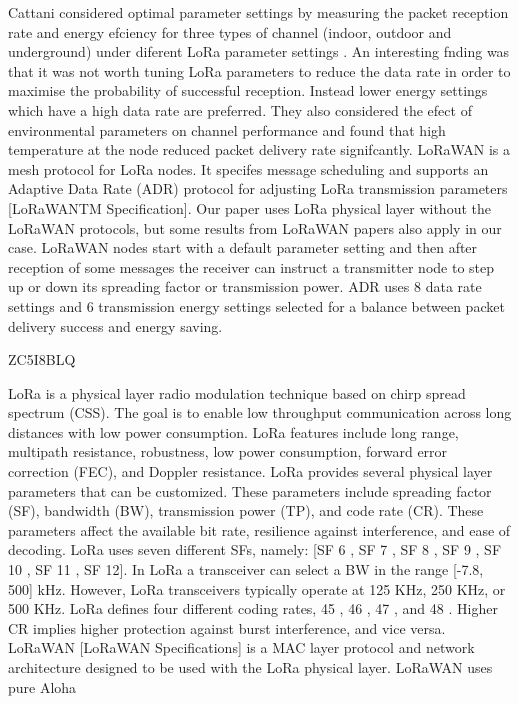 Cattani considered optimal parameter settings by measuring the packet reception rate and energy efciency for three types of channel (indoor,
	outdoor and underground) under diferent LoRa parameter settings \cite{marco_cattani_experimental_2017}.
An interesting fnding was that it was not worth tuning LoRa parameters to reduce the data rate in order to maximise the probability of successful reception.
Instead lower energy settings which have a high data rate are preferred.
They also considered the efect of environmental parameters on channel performance and found that high temperature at the node reduced packet delivery rate signifcantly.
LoRaWAN is a mesh protocol for LoRa nodes.
It specifes message scheduling and supports an Adaptive Data Rate (ADR) protocol for adjusting LoRa transmission parameters [LoRaWANTM Specification].
Our paper uses LoRa physical layer without the LoRaWAN protocols,
	but some results from LoRaWAN papers also apply in our case.
LoRaWAN nodes start with a default parameter setting and then after reception of some messages the receiver can instruct a transmitter node to step up or down its spreading factor or transmission power.
ADR uses 8 data rate settings and 6 transmission energy settings selected for a balance between packet delivery success and energy saving.


\cite{farooq_search_2018} ZC5I8BLQ

LoRa is a physical layer radio modulation technique based on chirp spread spectrum (CSS).
The goal is to enable low throughput communication across long distances with low power consumption.
LoRa features include long range,
	multipath resistance,
	robustness,
	low power consumption,
	forward error correction (FEC),
	and Doppler resistance.
LoRa provides several physical layer parameters that can be customized.
These parameters include spreading factor (SF),
	bandwidth (BW),
	transmission power (TP),
	and code rate (CR).
These parameters affect the available bit rate,
	resilience against interference,
	and ease of decoding.
LoRa uses seven different SFs,
	namely:
	[SF 6 ,
	SF 7 ,
	SF 8 ,
	SF 9 ,
	SF 10 ,
	SF 11 ,
	SF 12].
In LoRa a transceiver can select a BW in the range [-7.8, 500] kHz.
However,
	LoRa transceivers typically operate at 125 KHz, 250 KHz,
	or 500 KHz.
LoRa defines four different coding rates, 45 , 46 , 47 ,
	and 48 .
Higher CR implies higher protection against burst interference,
	and vice versa.
LoRaWAN [LoRaWAN Speciﬁcations] is a MAC layer protocol and network architecture designed to be used with the LoRa physical layer.
LoRaWAN uses pure Aloha

